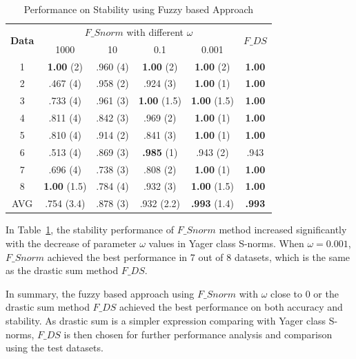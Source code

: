 \documentclass[conference]{IEEEtran}
\begin{document}
\begin{table}[h]\scriptsize
	\centering
	\caption{Performance on Stability using Fuzzy based Approach}
		\begin{tabular}{c|c c c c|c}
			\toprule
			\multirow{2}{*}{\textbf{Data}}  & \multicolumn{4}{c|}{$F\_{Snorm}$ with different $\omega$}    & \multirow{2}{*}{$F\_{DS}$}  \\
			& 1000         & 10          & 0.1            & 0.001          &   \\ 
			\midrule
			{1}     & \textbf{1.00} (2) & .960 (4) & \textbf{1.00} (2)  & \textbf{1.00} (2) & \textbf{1.00}   \\ 
			{2}     & .467 (4)    & .958  (2)     & .924  (3)         & \textbf{1.00} (1) & \textbf{1.00} \\ 
			{3}     & .733 (4)    & .961  (3)      & \textbf{1.00}  (1.5)        & \textbf{1.00} (1.5) & \textbf{1.00}  \\ 
			{4}     & .811  (4)   & .842   (3)        & .969    (2)       & \textbf{1.00} (1) & \textbf{1.00}  \\ 
			{5}     & .810  (4)   & .914   (2)   & .841  (3)            & \textbf{1.00} (1) & \textbf{1.00} \\ 
			{6}    & .513 (4)   & .869  (3)      & \textbf{.985} (1)            & .943  (2)        & .943             \\ 
			{7}    & .696  (4)      & .738    (3)      & .808    (2)     & \textbf{1.00} (1) & \textbf{1.00}  \\ 
			{8}    & \textbf{1.00}  (1.5)      & .784   (4)    & .932   (3)       & \textbf{1.00} (1.5) & \textbf{1.00}  \\ 
			\midrule
			{AVG}     & .754 (3.4)  & .878 (3)  & .932 (2.2) & \textbf{.993} (1.4)   & \textbf{.993}   \\
			\bottomrule
		\end{tabular}
	\label{fuzzy_sta}
\end{table}

In Table~\ref{fuzzy_sta}, the stability performance of $F\_{Snorm}$ method increased significantly with the decrease of parameter $\omega$ values in Yager class S-norms. When $\omega = 0.001$, $F\_{Snorm}$ achieved the best performance in 7 out of 8 datasets, which is the same as the drastic sum method $F\_{DS}$.

In summary, the fuzzy based approach using $F\_{Snorm}$ with $\omega$ close to 0 or the drastic sum method $F\_{DS}$ achieved the best performance on both accuracy and stability. As drastic sum is a simpler expression comparing with Yager class S-norms, $F\_{DS}$ is then chosen for further performance analysis and comparison using the test datasets.
\end{document}
